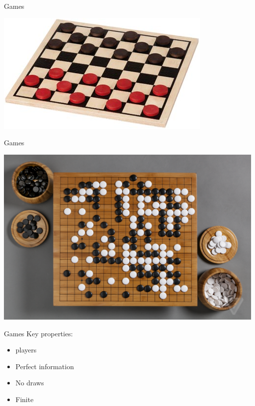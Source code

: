 \documentclass{beamer}
\begin{document}
\begin{frame}{Games}
	\begin{center}
		\includegraphics[scale=0.5]{checkers.jpg}
	\end{center}
\end{frame}

\begin{frame}{Games}
	\begin{center}
		\includegraphics[scale=0.23]{go.png}
	\end{center}
\end{frame}

\begin{frame}{Games}
	Key properties:
	\begin{itemize}
		\item{} players
		\item\pause Perfect information
		\item\pause No draws
		\item\pause Finite
	\end{itemize}
\end{frame}
\end{document}
